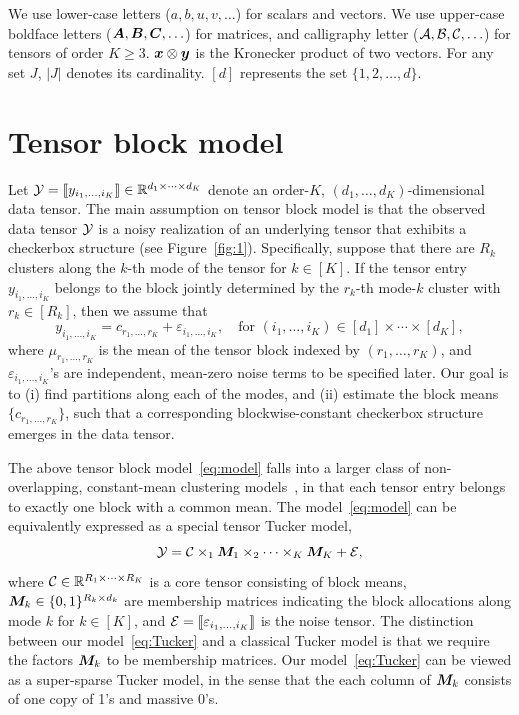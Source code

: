 \documentclass{article}
\begin{document}
We use lower-case letters ($a,b,u,v,\ldots$) for scalars and vectors. We use upper-case boldface letters ($\bm A,\bm B,\bm C,\ldots$) for matrices, and calligraphy letter ($\mathcal{A}, \mathcal{B}, \mathcal{C},\ldots$) for tensors of order $K\geq 3$. $\bm x\otimes \bm{y}$ is the Kronecker product of two vectors. For any set $J$, $|J|$ denotes its cardinality. $[d]$ represents the set $\{1,2,\ldots,d\}$. 


\section{Tensor block model}
Let $\mathcal{Y}=\llbracket y_{i_1,\ldots,i_K} \rrbracket\in\mathbb{R}^{d_1\times \cdots\times d_K}$ denote an order-$K$, $(d_1,\ldots,d_K)$-dimensional data tensor. The main assumption on tensor block model is that the observed data tensor $\mathcal{Y}$ is a noisy realization of an underlying tensor that exhibits a checkerbox structure (see Figure~\ref{fig:1}). Specifically, suppose that there are $R_k$ clusters along the $k$-th mode of the tensor for $k\in[K]$. If the tensor entry $y_{i_1,\ldots,i_K}$ belongs to the block jointly determined by the $r_k$-th mode-$k$ cluster with $r_k\in[R_k]$, then we assume that 
\begin{equation}\label{eq:model}
y_{i_1,\ldots,i_K}=c_{r_1,\ldots,r_K}+\varepsilon_{i_1,\ldots,i_K},\quad \text{for }(i_1,\ldots,i_K)\in[d_1]\times\cdots\times [d_K],
\end{equation}
where $\mu_{r_1,\ldots,r_K}$ is the mean of the tensor block indexed by $(r_1,\ldots,r_K)$, and $\varepsilon_{i_1,\ldots,i_K}$'s are independent, mean-zero noise terms to be specified later. Our goal is to (i) find partitions along each of the modes, and (ii) estimate the block means $\{c_{r_1,\ldots,r_K}\}$, such that a corresponding blockwise-constant checkerbox structure emerges in the data tensor. 

The above tensor block model~\eqref{eq:model} falls into a larger class of non-overlapping, constant-mean clustering models~\cite{madeira2004biclustering}, in that each tensor entry belongs to exactly one block with a common mean. The model~\eqref{eq:model} can be equivalently expressed as a special tensor Tucker model,
\begin{equation}\label{eq:Tucker}
\mathcal{Y}=\mathcal{C}\times_1\bm M_1\times_2\cdots \times_K \bm M_K+\mathcal{E},
\end{equation}
where $\mathcal{C}\in\mathbb{R}^{R_1\times\cdots\times R_K}$ is a core tensor consisting of block means, $\bm M_k \in\{0,1\}^{R_k\times d_k}$ are membership matrices indicating the block allocations along mode $k$ for $k\in[K]$, and $\mathcal{E}=\llbracket \varepsilon_{i_1,\ldots,i_K} \rrbracket$ is the noise tensor. The distinction between our model~\eqref{eq:Tucker} and a classical Tucker model is that we require the factors $\bm M_k$ to be membership matrices. Our model~\eqref{eq:Tucker} can be viewed as a super-sparse Tucker model, in the sense that the each column of $\bm M_k$ consists of one copy of 1's and massive 0's. 
\end{document}
